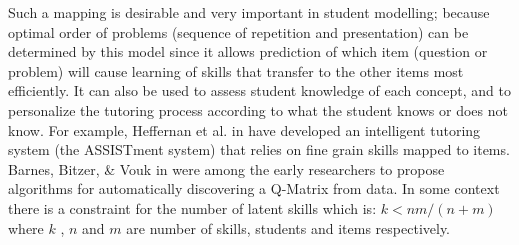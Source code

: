 Such a mapping is desirable and very important in student modelling; because optimal order of problems (sequence of repetition and presentation) can be determined by this model since it allows prediction of which item (question or problem) will cause learning of skills that transfer to the other items most efficiently. It can also be used to assess student knowledge of each concept, and to personalize the tutoring process according to what the student knows or does not know.  For example, Heffernan et al. in \citep{feng2009using} have developed an intelligent tutoring system (the ASSISTment system) that relies on fine grain skills mapped to items.  Barnes, Bitzer, \& Vouk in \citep{barnes2005experimental} were among the early researchers to propose algorithms for automatically discovering a Q-Matrix from data. In some context there is a constraint for the number of latent skills which is: $k<nm/(n+m)$ \protect\citep{lee1999learning} where $k$ , $n$ and $m$ are number of skills, students and items respectively.
  
